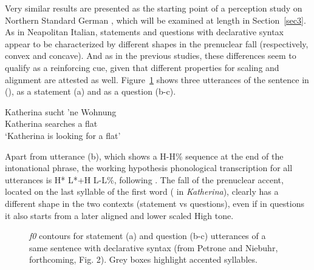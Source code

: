 Very similar results are presented as the starting point of a perception study on Northern Standard German \cite{petrone2014intonation}, which will be examined at length in Section~\ref{sec3}. As in Neapolitan Italian, statements and questions with declarative syntax appear to be characterized by different shapes in the prenuclear fall (respectively, convex and concave). And as in the previous studies, these differences seem to qualify as a reinforcing cue, given that different properties for scaling and alignment are attested as well. Figure~\ref{fig211} shows three utterances of the sentence in (), as a statement (a) and as a question (b-c). 

\ea
\gll Katherina sucht 'ne Wohnung\\
Katherina searches a flat\\
\glt ‘Katherina is looking for a flat’
\z

Apart from utterance (b), which shows a H-H\% sequence at the end of the intonational phrase, the working hypothesis phonological transcription for all utterances is H* L*+H L-L\%, following \citet{grice2002deutsche}. The fall of the prenuclear accent, located on the last syllable of the first word (\textipa{[na]} in \textit{Katherina}), clearly has a different shape in the two contexts (statement vs questions), even if in questions it also starts from a later aligned and lower scaled High tone.

\begin{figure}
\centering
{}
\caption{\textit{f0} contours for statement (a) and question (b-c) utterances of a same sentence with declarative syntax (from Petrone and Niebuhr, forthcoming, Fig. 2). Grey boxes highlight accented syllables.}
\label{fig211}\end{figure}

